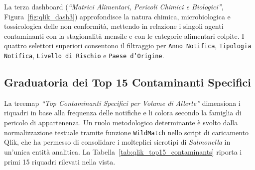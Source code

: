 La terza dashboard (\textit{``Matrici Alimentari, Pericoli Chimici e Biologici''}, Figura~\ref{fig:qlik_dash3}) approfondisce la natura chimica, microbiologica e tossicologica delle non conformità, mettendo in relazione i singoli agenti contaminanti con la stagionalità mensile e con le categorie alimentari colpite. I quattro selettori superiori consentono il filtraggio per \texttt{Anno Notifica}, \texttt{Tipologia Notifica}, \texttt{Livello di Rischio} e \texttt{Paese d'Origine}.


\subsection{Graduatoria dei Top 15 Contaminanti Specifici}
La treemap \textit{``Top Contaminanti Specifici per Volume di Allerte''} dimensiona i riquadri in base alla frequenza delle notifiche e li colora secondo la famiglia di pericolo di appartenenza. Un ruolo metodologico determinante è svolto dalla normalizzazione testuale tramite funzione \texttt{WildMatch} nello script di caricamento Qlik, che ha permesso di consolidare i molteplici sierotipi di \textit{Salmonella} in un'unica entità analitica. La Tabella~\ref{tab:qlik_top15_contaminants} riporta i primi 15 riquadri rilevati nella vista.

